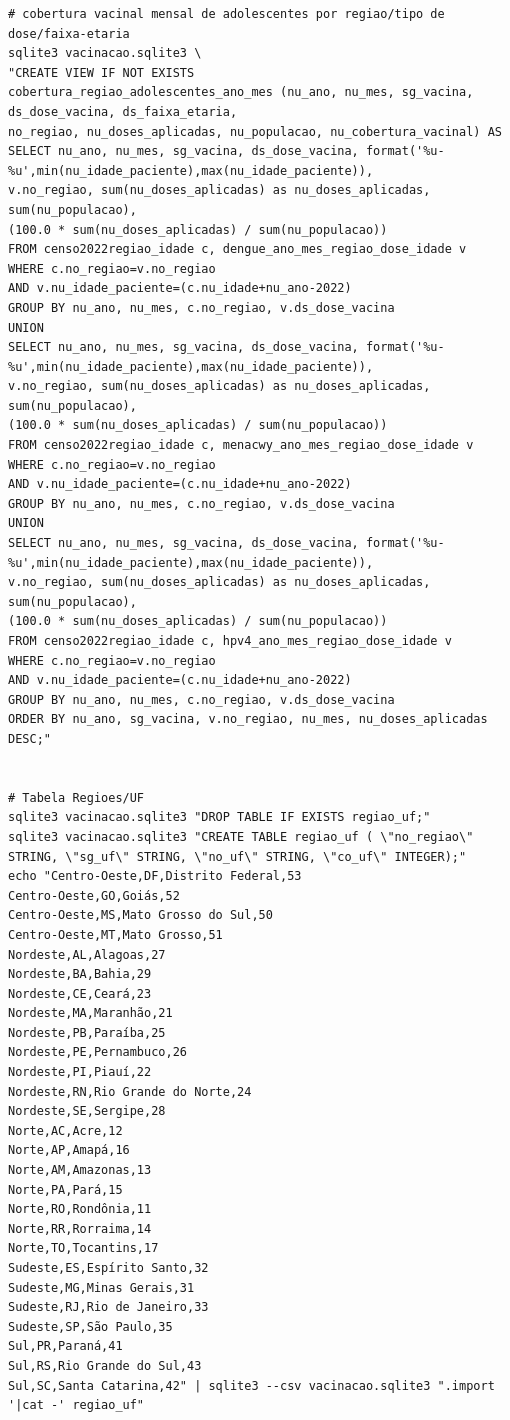 \documentclass[12pt]{article}
\begin{document}
\begin{verbatim}
# cobertura vacinal mensal de adolescentes por regiao/tipo de dose/faixa-etaria
sqlite3 vacinacao.sqlite3 \
"CREATE VIEW IF NOT EXISTS
cobertura_regiao_adolescentes_ano_mes (nu_ano, nu_mes, sg_vacina, ds_dose_vacina, ds_faixa_etaria,
no_regiao, nu_doses_aplicadas, nu_populacao, nu_cobertura_vacinal) AS
SELECT nu_ano, nu_mes, sg_vacina, ds_dose_vacina, format('%u-%u',min(nu_idade_paciente),max(nu_idade_paciente)),
v.no_regiao, sum(nu_doses_aplicadas) as nu_doses_aplicadas, sum(nu_populacao),
(100.0 * sum(nu_doses_aplicadas) / sum(nu_populacao))
FROM censo2022regiao_idade c, dengue_ano_mes_regiao_dose_idade v
WHERE c.no_regiao=v.no_regiao
AND v.nu_idade_paciente=(c.nu_idade+nu_ano-2022)
GROUP BY nu_ano, nu_mes, c.no_regiao, v.ds_dose_vacina
UNION
SELECT nu_ano, nu_mes, sg_vacina, ds_dose_vacina, format('%u-%u',min(nu_idade_paciente),max(nu_idade_paciente)),
v.no_regiao, sum(nu_doses_aplicadas) as nu_doses_aplicadas, sum(nu_populacao),
(100.0 * sum(nu_doses_aplicadas) / sum(nu_populacao))
FROM censo2022regiao_idade c, menacwy_ano_mes_regiao_dose_idade v
WHERE c.no_regiao=v.no_regiao
AND v.nu_idade_paciente=(c.nu_idade+nu_ano-2022)
GROUP BY nu_ano, nu_mes, c.no_regiao, v.ds_dose_vacina
UNION
SELECT nu_ano, nu_mes, sg_vacina, ds_dose_vacina, format('%u-%u',min(nu_idade_paciente),max(nu_idade_paciente)),
v.no_regiao, sum(nu_doses_aplicadas) as nu_doses_aplicadas, sum(nu_populacao),
(100.0 * sum(nu_doses_aplicadas) / sum(nu_populacao))
FROM censo2022regiao_idade c, hpv4_ano_mes_regiao_dose_idade v
WHERE c.no_regiao=v.no_regiao
AND v.nu_idade_paciente=(c.nu_idade+nu_ano-2022)
GROUP BY nu_ano, nu_mes, c.no_regiao, v.ds_dose_vacina
ORDER BY nu_ano, sg_vacina, v.no_regiao, nu_mes, nu_doses_aplicadas DESC;"


# Tabela Regioes/UF
sqlite3 vacinacao.sqlite3 "DROP TABLE IF EXISTS regiao_uf;"
sqlite3 vacinacao.sqlite3 "CREATE TABLE regiao_uf ( \"no_regiao\" STRING, \"sg_uf\" STRING, \"no_uf\" STRING, \"co_uf\" INTEGER);"
echo "Centro-Oeste,DF,Distrito Federal,53
Centro-Oeste,GO,Goiás,52
Centro-Oeste,MS,Mato Grosso do Sul,50
Centro-Oeste,MT,Mato Grosso,51
Nordeste,AL,Alagoas,27
Nordeste,BA,Bahia,29
Nordeste,CE,Ceará,23
Nordeste,MA,Maranhão,21
Nordeste,PB,Paraíba,25
Nordeste,PE,Pernambuco,26
Nordeste,PI,Piauí,22
Nordeste,RN,Rio Grande do Norte,24
Nordeste,SE,Sergipe,28
Norte,AC,Acre,12
Norte,AP,Amapá,16
Norte,AM,Amazonas,13
Norte,PA,Pará,15
Norte,RO,Rondônia,11
Norte,RR,Rorraima,14
Norte,TO,Tocantins,17
Sudeste,ES,Espírito Santo,32
Sudeste,MG,Minas Gerais,31
Sudeste,RJ,Rio de Janeiro,33
Sudeste,SP,São Paulo,35
Sul,PR,Paraná,41
Sul,RS,Rio Grande do Sul,43
Sul,SC,Santa Catarina,42" | sqlite3 --csv vacinacao.sqlite3 ".import '|cat -' regiao_uf"
\end{verbatim}
\end{document}
